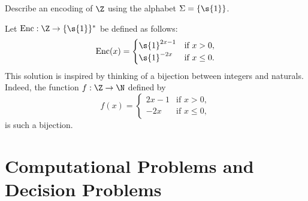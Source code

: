 \begin{flex}
\begin{exercise} \label{exercise:Unary-encoding-of-integers}
Describe an encoding of $\Z$ using the alphabet $\Sigma = \{\s{1}\}$.
\end{exercise}

\begin{solution}
Let $\text{Enc}:\Z \to \{\s{1}\}^*$ be defined as follows:
\[
\text{Enc}(x) = 
\begin{cases}
\s{1}^{2x-1} & \text{if $x > 0$}, \\
\s{1}^{-2x}  & \text{if $x \leq 0$.}
\end{cases}
\]
This solution is inspired by thinking of a bijection between integers and naturals. Indeed, the function $f: \Z \to \N$ defined by  
\[
f(x) = 
\begin{cases}
2x-1 & \text{if $x > 0$}, \\
-2x  & \text{if $x \leq 0$,}
\end{cases}
\]
is such a bijection.
\end{solution}
\end{flex}




\section{Computational Problems and Decision Problems}
\label{section:Computational-Problems-and-Decision-Problems}


